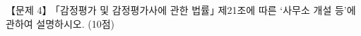 \begin{longquestion}{【문제 4】}
｢감정평가 및 감정평가사에 관한 법률｣ 제21조에 따른 ‘사무소 개설 등’에 관하여 설명하시오. (10점) \par
\end{longquestion}
